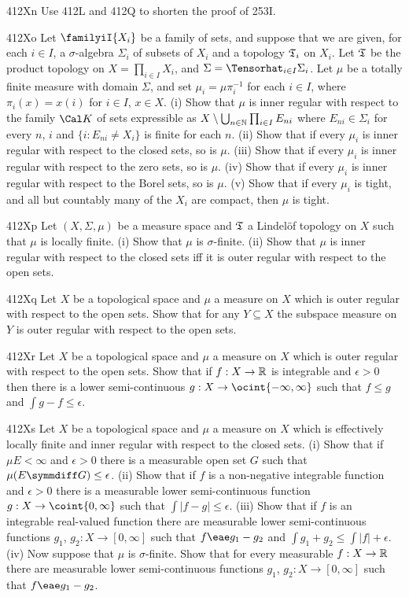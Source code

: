 {\spheader 412Xn Use 412L and 412Q to shorten the proof of 253I.

\spheader 412Xo Let $\familyiI{X_i}$ be a family of sets, and
suppose that we are given, for each $i\in I$, a $\sigma$-algebra
$\Sigma_i$ of subsets of $X_i$ and a topology $\frak T_i$ on $X_i$.
Let $\frak T$ be the product topology on $X=\prod_{i\in I}X_i$, and
$\Sigma=\Tensorhat_{i\in I}\Sigma_i$.   Let $\mu$ be a totally finite
measure with domain
$\Sigma$, and set $\mu_i=\mu\pi_i^{-1}$ for each $i\in I$, where
$\pi_i(x)=x(i)$ for $i\in I$, $x\in X$.   (i) Show that $\mu$ is
inner regular with respect to the family $\Cal K$ of sets expressible as
$X\setminus\bigcup_{n\in\Bbb N}\prod_{i\in I}E_{ni}$ where
$E_{ni}\in\Sigma_i$ for every $n$, $i$ and $\{i:E_{ni}\ne X_i\}$ is
finite for each $n$.
(ii) Show that if every $\mu_i$ is inner regular with respect to the
closed sets, so is $\mu$.
(iii) Show that if every $\mu_i$ is inner regular with respect to the
zero sets, so is $\mu$.
(iv) Show that if every $\mu_i$ is inner regular with respect to the
Borel sets, so is $\mu$.
(v) Show that if every $\mu_i$ is tight, and all but countably many of
the $X_i$ are compact, then $\mu$ is tight.

\spheader 412Xp Let $(X,\Sigma,\mu)$ be a measure space and $\frak T$ a
Lindel\"of topology on $X$ such that $\mu$ is locally finite.   (i) Show
that $\mu$ is
$\sigma$-finite.   (ii) Show that $\mu$ is inner regular with respect to
the closed sets iff it is outer regular with respect to the open sets.

\spheader 412Xq Let $X$ be a topological space and $\mu$ a measure on
$X$ which is outer regular with respect to the open sets.   Show that
for any $Y\subseteq X$ the subspace measure on $Y$ is outer regular with
respect to the open sets.

\spheader 412Xr Let $X$ be a topological space and $\mu$ a measure on
$X$ which is outer regular with respect to the open sets.   Show that if
$f:X\to\Bbb R$ is integrable and $\epsilon>0$ then there is a lower
semi-continuous $g:X\to\ocint{-\infty,\infty}$ such that $f\le g$ and
$\int g-f\le\epsilon$.

\sqheader 412Xs Let $X$ be a topological space and $\mu$ a measure on $X$ which is
effectively locally finite and inner regular with respect to the closed sets.
(i) Show that if $\mu E<\infty$ and $\epsilon>0$ there is a measurable open set $G$
such that $\mu(E\symmdiff G)\le\epsilon$.   (ii) Show that if $f$ is a
non-negative integrable function and $\epsilon>0$ there is a measurable lower
semi-continuous function $g:X\to\coint{0,\infty}$ such that $\int|f-g|\le\epsilon$.
(iii) Show that if $f$ is an integrable
real-valued function there are measurable lower semi-continuous functions
$g_1$, $g_2:X\to[0,\infty]$ such that $f\eae g_1-g_2$ and
$\int g_1+g_2\le\int|f|+\epsilon$.   (iv) Now suppose that $\mu$ is $\sigma$-finite.
Show that for every measurable $f:X\to\Bbb R$ there are measurable lower
semi-continuous functions $g_1$, $g_2:X\to[0,\infty]$ such that $f\eae g_1-g_2$.

}
